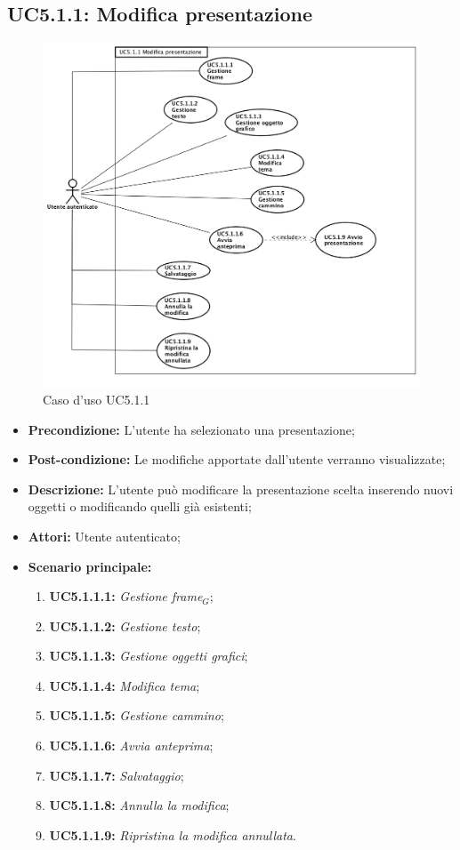 \subsection{ UC5.1.1: Modifica presentazione}

\begin{figure}[h]
	\begin{center}
	\includegraphics[scale=0.4]{diagram/UC5-1-1.png}
	\caption{Caso d'uso UC5.1.1}
	\end{center}
\end{figure}
\begin{itemize}
	\item \textbf{Precondizione:} L'utente ha selezionato una presentazione;
	\item \textbf{Post-condizione:} Le modifiche apportate dall'utente verranno visualizzate;
	\item \textbf{Descrizione:} L'utente può modificare la presentazione scelta inserendo nuovi oggetti o modificando quelli già esistenti;
	\item \textbf{Attori:} Utente autenticato;
	\item \textbf{Scenario principale:}
	\begin{enumerate}
		\item \textbf{ UC5.1.1.1:} \textit{ Gestione frame$_G$};
		\item \textbf{ UC5.1.1.2:} \textit{ Gestione testo};
		\item \textbf{ UC5.1.1.3:} \textit{ Gestione oggetti grafici};
		\item \textbf{ UC5.1.1.4:} \textit{ Modifica tema};
		\item \textbf{ UC5.1.1.5:} \textit{ Gestione cammino};
		\item \textbf{ UC5.1.1.6:} \textit{ Avvia anteprima};
		\item \textbf{ UC5.1.1.7:} \textit{ Salvataggio};
		\item \textbf{ UC5.1.1.8:} \textit{ Annulla la modifica};
		\item \textbf{ UC5.1.1.9:} \textit{ Ripristina la modifica annullata}.
	\end{enumerate}
\end{itemize}
